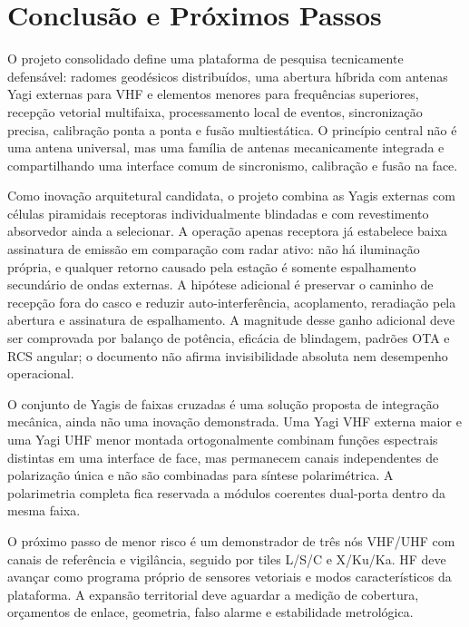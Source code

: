 \chapter{Conclusão e Próximos Passos}

O projeto consolidado define uma plataforma de pesquisa tecnicamente defensável: radomes geodésicos distribuídos, uma abertura híbrida com antenas Yagi externas para VHF e elementos menores para frequências superiores, recepção vetorial multifaixa, processamento local de eventos, sincronização precisa, calibração ponta a ponta e fusão multiestática. O princípio central não é uma antena universal, mas uma família de antenas mecanicamente integrada e compartilhando uma interface comum de sincronismo, calibração e fusão na face.

Como inovação arquitetural candidata, o projeto combina as Yagis externas com células piramidais receptoras individualmente blindadas e com revestimento absorvedor ainda a selecionar. A operação apenas receptora já estabelece baixa assinatura de emissão em comparação com radar ativo: não há iluminação própria, e qualquer retorno causado pela estação é somente espalhamento secundário de ondas externas. A hipótese adicional é preservar o caminho de recepção fora do casco e reduzir auto-interferência, acoplamento, reradiação pela abertura e assinatura de espalhamento. A magnitude desse ganho adicional deve ser comprovada por balanço de potência, eficácia de blindagem, padrões OTA e RCS angular; o documento não afirma invisibilidade absoluta nem desempenho operacional.

O conjunto de Yagis de faixas cruzadas é uma solução proposta de integração mecânica, ainda não uma inovação demonstrada. Uma Yagi VHF externa maior e uma Yagi UHF menor montada ortogonalmente combinam funções espectrais distintas em uma interface de face, mas permanecem canais independentes de polarização única e não são combinadas para síntese polarimétrica. A polarimetria completa fica reservada a módulos coerentes dual-porta dentro da mesma faixa.

O próximo passo de menor risco é um demonstrador de três nós VHF/UHF com canais de referência e vigilância, seguido por tiles L/S/C e X/Ku/Ka. HF deve avançar como programa próprio de sensores vetoriais e modos característicos da plataforma. A expansão territorial deve aguardar a medição de cobertura, orçamentos de enlace, geometria, falso alarme e estabilidade metrológica.
